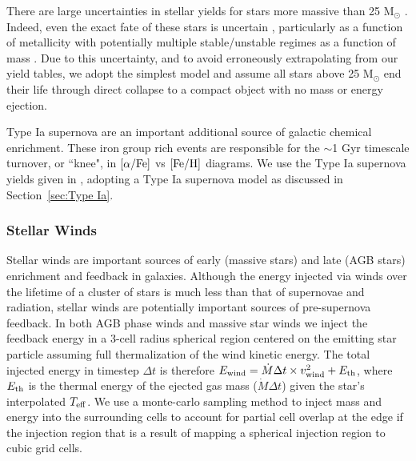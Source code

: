 \documentclass[twocolumn]{aastex61}
\begin{document}
There are large uncertainties in stellar yields for stars more massive than 25 M$_{\odot}$ \citep[see ][and references therein]{Cote2016}. Indeed, even the exact fate of these stars is uncertain \citep[e.g.][]{Woosley2002,Zhang2008,Ugliano2012}, particularly as a function of metallicity \citep{Fryer2012} with potentially multiple stable/unstable regimes as a function of mass \citep{Heger2003}. Due to this uncertainty, and to avoid erroneously extrapolating from our yield tables, we adopt the simplest model and assume all stars above 25 M$_{\odot}$ end their life through direct collapse to a compact object with no mass or energy ejection.

Type Ia supernova are an important additional source of galactic chemical enrichment. These iron group rich events are responsible for the $\sim$1 Gyr timescale turnover, or ``knee", in $[\alpha/\rm{Fe}]$ vs $[\rm{Fe}/\rm{H}]$ diagrams. We use the Type Ia supernova yields given in \citet{Thielemann1986}, adopting a Type Ia supernova model as discussed in Section~\ref{sec:Type Ia}. 

\subsubsection{Stellar Winds}
\label{sec:stellar winds}
Stellar winds are important sources of early (massive stars) and late (AGB stars) enrichment and feedback in galaxies. Although the energy injected via winds over the lifetime of a cluster of stars is much less than that of supernovae and radiation, stellar winds are potentially important sources of pre-supernova feedback. In both AGB phase winds and massive star winds we inject the feedback energy in a 3-cell radius spherical region centered on the emitting star particle assuming full thermalization of the wind kinetic energy. The total injected energy in timestep $\Delta t$ is therefore $E_{\rm wind} = \dot{M}\Delta t \times v^2_{\rm wind} + E_{\rm th}$, where $E_{\rm th}$ is the thermal energy of the ejected gas mass ($\dot{M}\Delta t$) given the star's interpolated $T_{\rm eff}$. We use a monte-carlo sampling method to inject mass and energy into the surrounding cells to account for partial cell overlap at the edge if the injection region that is a result of mapping a spherical injection region to cubic grid cells.
\end{document}
